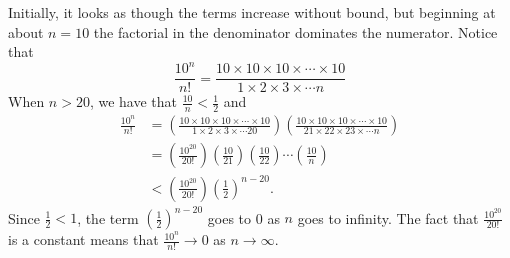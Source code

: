 \begin{activitySolution}
Initially, it looks as though the terms increase without bound, but beginning at about $n=10$ the factorial in the denominator dominates the numerator. Notice that
 \[\frac{10^n}{n!} = \frac{10 \times 10 \times 10 \times \cdots \times 10}{1 \times 2 \times 3 \times \cdots n}\]
When $n > 20$, we have that $\frac{10}{n} < \frac{1}{2}$ and 
\begin{align*}
\frac{10^n}{n!} &= \left(\frac{10 \times 10 \times 10 \times \cdots \times 10}{1 \times 2 \times 3 \times \cdots 20}\right) \left(\frac{10 \times 10 \times 10 \times \cdots \times 10}{21 \times 22 \times 23 \times \cdots n}\right) \\
    &= \left(\frac{10^{20}}{20!}\right) \left(\frac{10}{21}\right) \left(\frac{10}{22}\right) \cdots \left(\frac{10}{n}\right)  \\
    &< \left(\frac{10^{20}}{20!}\right) \left(\frac{1}{2}\right)^{n-20}.
\end{align*}
Since $\frac{1}{2}<1$, the term $\left(\frac{1}{2}\right)^{n-20}$ goes to 0 as $n$ goes to infinity. The fact that $\frac{10^{20}}{20!}$ is a constant means that $\frac{10^n}{n!} \to 0$ as $n \to \infty$. 

\ea
\end{activitySolution}
\aftera 